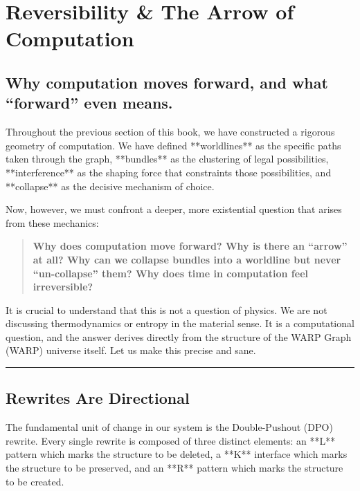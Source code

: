 \chapter{Reversibility \& The Arrow of Computation}

\section{\textbf{Why computation moves forward, and what ``forward'' even means.}}

Throughout the previous section of this book, we have constructed a rigorous geometry of computation. We have defined **worldlines** as the specific paths taken through the graph, **bundles** as the clustering of legal possibilities, **interference** as the shaping force that constraints those possibilities, and **collapse** as the decisive mechanism of choice.

Now, however, we must confront a deeper, more existential question that arises from these mechanics:

\begin{quote}
\textbf{Why does computation move forward? Why is there an ``arrow'' at all? Why can we collapse bundles into a worldline but never ``un-collapse'' them? Why does time in computation feel irreversible?}
\end{quote}

It is crucial to understand that this is not a question of physics. We are not discussing thermodynamics or entropy in the material sense. It is a computational question, and the answer derives directly from the structure of the WARP Graph (WARP) universe itself. Let us make this precise and sane.

\begin{center}\rule{0.5\linewidth}{0.5pt}\end{center}

\section{\texorpdfstring{\textbf{Rewrites Are Directional}}{14.1 --- Rewrites Are Directional}}

The fundamental unit of change in our system is the Double-Pushout (DPO) rewrite. Every single rewrite is composed of three distinct elements: an **L** pattern which marks the structure to be deleted, a **K** interface which marks the structure to be preserved, and an **R** pattern which marks the structure to be created.

